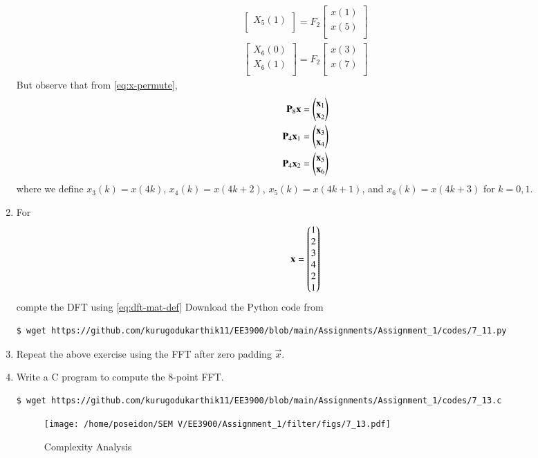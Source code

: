 \documentclass[journal,12pt,twocolumn]{IEEEtran}
\renewcommand\thesection{\arabic{section}}
\begin{document}
\begin{enumerate}[label=\arabic*.,ref=\thesection.\theenumi]
\begin{align}
\begin{bmatrix}
X_{5}(1)\\ 
\end{bmatrix}
= F_{2}
\begin{bmatrix}
x(1) \\ 
x(5) \\ 
\end{bmatrix} \\
\begin{bmatrix}
X_{6}(0) \\ 
X_{6}(1)\\ 
\end{bmatrix}
= F_{2}
\begin{bmatrix}
x(3) \\ 
x(7) \\ 
\end{bmatrix}
\end{align}
But observe that from \eqref{eq:x-permute},
\begin{align}
	\mathbf{P}_8\mathbf{x} &= \begin{pmatrix}\mathbf{x}_1\\\mathbf{x}_2\end{pmatrix} \\
	\mathbf{P}_4\mathbf{x}_1 &= \begin{pmatrix}\mathbf{x}_3\\\mathbf{x}_4\end{pmatrix} \\ 
	\mathbf{P}_4\mathbf{x}_2 &= \begin{pmatrix}\mathbf{x}_5\\\mathbf{x}_6\end{pmatrix}
\end{align}
where we define $x_3(k) = x(4k)$, $x_4(k) = x(4k + 2)$, $x_5(k) = x(4k + 1)$, and $x_6(k) = x(4k + 3)$ for $k = 0, 1$.
\item For 
    \begin{align}
	    \mathbf{x} = \begin{pmatrix}1\\2\\3\\4\\2\\1\end{pmatrix}
        \label{eq:equation1}
    \end{align}
    compte the DFT  
		using 
	    \eqref{eq:dft-mat-def}
\solution Download the Python code from 
\begin{lstlisting}
$ wget https://github.com/kurugodukarthik11/EE3900/blob/main/Assignments/Assignment_1/codes/7_11.py
\end{lstlisting}
\item Repeat the above exercise using the FFT
	    after zero padding $\vec{x}$.
\item Write a C program to compute the 8-point FFT.
\begin{lstlisting}
$ wget https://github.com/kurugodukarthik11/EE3900/blob/main/Assignments/Assignment_1/codes/7_13.c
\end{lstlisting}
\begin{figure}[!ht]
\centering
\texttt{[image: /home/poseidon/SEM V/EE3900/Assignment\_1/filter/figs/7\_13.pdf]}
\caption{Complexity Analysis}
\end{figure} 
\end{enumerate}
 
\end{document}
